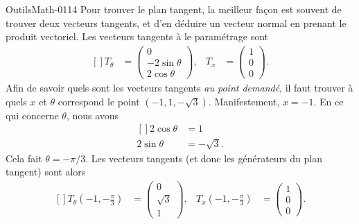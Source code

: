 \begin{corrige}{OutilsMath-0114}
    Pour trouver le plan tangent, la meilleur façon est souvent de trouver deux vecteurs tangents, et d'en déduire un vecteur normal en prenant le produit vectoriel. Les vecteurs tangents à le paramétrage sont 
    \begin{equation}
        \begin{aligned}[]
            T_{\theta}&=\begin{pmatrix}
                0    \\ 
                -2\sin\theta    \\ 
                2\cos\theta    
            \end{pmatrix},&
            T_x&=\begin{pmatrix}
                1    \\ 
                0    \\ 
                0    
            \end{pmatrix}.
        \end{aligned}
    \end{equation}
    Afin de savoir quels sont les vecteurs tangents \emph{au point demandé},  il faut trouver à quels $x$ et $\theta$ correspond le point $(-1,1,-\sqrt{3})$. Manifestement, $x=-1$. En ce qui concerne $\theta$, nous avons
    \begin{equation}
        \begin{aligned}[]
            2\cos\theta&=1\\
            2\sin\theta&=-\sqrt{3}.
        \end{aligned}
    \end{equation}
    Cela fait $\theta=-\pi/3$. Les vecteurs tangents (et donc les générateurs du plan tangent) sont alors
    \begin{equation}
        \begin{aligned}[]
            T_{\theta}(-1,-\frac{ \pi }{ 3 })&=\begin{pmatrix}
                0    \\ 
                \sqrt{3}    \\ 
                1    
            \end{pmatrix},&
            T_x(-1,-\frac{ \pi }{ 3 })&=\begin{pmatrix}
                1    \\ 
                0    \\ 
                0    
            \end{pmatrix}.
        \end{aligned}
    \end{equation}
    

\end{corrige}
